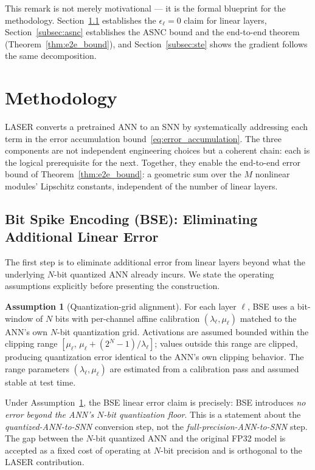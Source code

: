 \documentclass{article}
\theoremstyle{plain}
\theoremstyle{definition}
\newtheorem{assumption}[theorem]{Assumption}
\theoremstyle{remark}
\begin{document}
This remark is not merely motivational — it is the formal blueprint for the
methodology. Section~\ref{subsec:bse} establishes the $\epsilon_\ell = 0$ claim for
linear layers, Section~\ref{subsec:asnc} establishes the ASNC bound and the
end-to-end theorem (Theorem~\ref{thm:e2e_bound}), and Section~\ref{subsec:ste}
shows the gradient follows the same decomposition.


\section{Methodology}
\label{sec:methodology}

LASER converts a pretrained ANN to an SNN by systematically addressing each term in
the error accumulation bound~\eqref{eq:error_accumulation}. The three components
are not independent engineering choices but a coherent chain: each is the logical
prerequisite for the next. Together, they enable the end-to-end error bound of
Theorem~\ref{thm:e2e_bound}: a geometric sum over the $M$ nonlinear modules'
Lipschitz constants, independent of the number of linear layers.

\subsection{Bit Spike Encoding (BSE): Eliminating Additional Linear Error}
\label{subsec:bse}

The first step is to eliminate additional error from linear layers beyond what the
underlying $N$-bit quantized ANN already incurs. We state the operating assumptions
explicitly before presenting the construction.

\begin{assumption}[Quantization-grid alignment]
\label{asm:quantization_alignment}
For each layer $\ell$, BSE uses a bit-window of $N$ bits with per-channel affine
calibration $(\lambda_\ell, \mu_\ell)$ matched to the ANN's own $N$-bit quantization
grid. Activations are assumed bounded within the clipping range
$[\mu_\ell,\, \mu_\ell + (2^N-1)/\lambda_\ell]$; values outside this range are
clipped, producing quantization error identical to the ANN's own clipping behavior.
The range parameters $(\lambda_\ell, \mu_\ell)$ are estimated from a calibration pass
and assumed stable at test time.
\end{assumption}

Under Assumption~\ref{asm:quantization_alignment}, the BSE linear error claim is
precisely: BSE introduces \emph{no error beyond the ANN's $N$-bit quantization floor}.
This is a statement about the \emph{quantized-ANN-to-SNN} conversion step, not the
\emph{full-precision-ANN-to-SNN} step. The gap between the $N$-bit quantized ANN and
the original FP32 model is accepted as a fixed cost of operating at $N$-bit precision
and is orthogonal to the LASER contribution.
\end{document}
